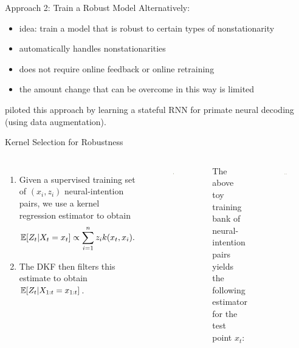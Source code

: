 \documentclass[aspectratio=169,19pt,xetex,handout]{beamer}
\begin{document}
\begin{frame}{Approach 2: Train a Robust Model}
\Large
Alternatively:
\bigskip

\begin{itemize}
    \item idea: train a model that is robust to certain types of nonstationarity
    \item automatically handles nonstationarities
    \item does not require online feedback or online retraining
    \item the amount change that can be overcome in this way is limited
\end{itemize}
\textcite{Sus12,Sus16} piloted this approach by learning a stateful RNN for primate neural decoding (using data augmentation).
\end{frame}

\begin{frame}{Kernel Selection for Robustness}
\Large
\vspace{-15pt}
\begin{columns}
\raggedright
\begin{enumerate}
\item Given a supervised training set of $(x_i,z_i)$ neural-intention pairs, we use a kernel regression estimator to obtain
\[
\operatorname{\mathbb{E}}[Z_t|X_t=x_t] \propto \sum_{i=1}^n z_i k(x_t, x_i).
\]
\item The DKF then filters this estimate to obtain $\operatorname{\mathbb{E}}[Z_t|X_{1:t}=x_{1:t}]$.
\end{enumerate}

\raggedleft
\begin{figure}
\raggedleft
\includegraphics[width=0.5\textwidth]{training_bank}
\end{figure}

The above toy training bank of neural-intention pairs yields the following estimator for the test point $x_t$:

\begin{figure}
\raggedleft
\includegraphics[width=0.9\textwidth]{kernel_regression}
\end{figure}

\end{columns}
\end{frame}
\end{document}
